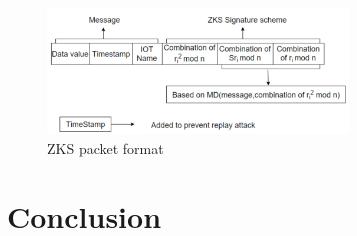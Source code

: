 \documentclass[letterpaper,twocolumn,10pt]{article}
\begin{document}
\begin{figure}[htbp]
	\begin{center}
        \includegraphics[width=80mm]{zks_packet.png}
		\caption{ZKS packet format}
		\label{zks_packet}
	\end{center}
\end{figure}
\section{Conclusion}



{
  \footnotesize 
  \small 
  
  
}
\end{document}
